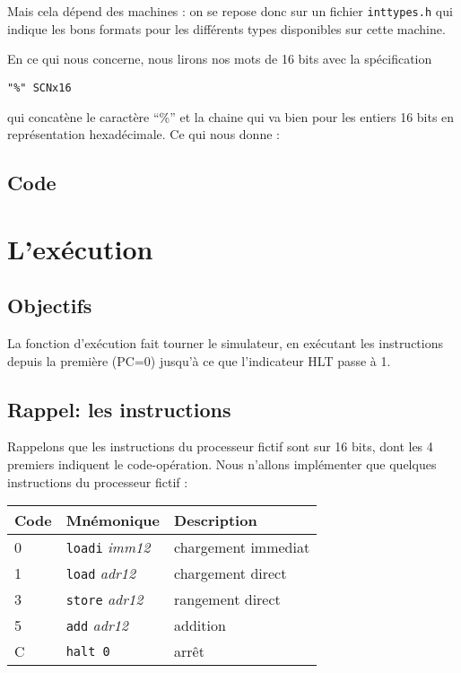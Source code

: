 \documentclass[10pt]{article}
\begin{document}
Mais cela dépend des machines : on se repose donc sur un fichier
\texttt{inttypes.h} qui indique les bons formats pour les différents types
disponibles sur cette machine.

En ce qui nous concerne, nous lirons nos mots de 16 bits avec la spécification
\begin{center}
\texttt{"\%" SCNx16}
\end{center}
qui concatène le caractère ``\%'' et la chaine qui va bien pour les 
entiers 16 bits en représentation hexadécimale. Ce qui nous donne :

\subsection{Code}
 


\section{L'exécution}

\subsection{Objectifs}
La fonction d'exécution fait tourner le simulateur, en exécutant les instructions 
depuis la première (PC=0) jusqu'à ce que l'indicateur HLT passe à 1.

\subsection{Rappel: les instructions}

Rappelons que les instructions du processeur fictif sont sur 16 bits,
dont les 4 premiers indiquent le code-opération.
Nous n'allons implémenter que quelques instructions du processeur fictif :

\begin{center}
\begin{tabular}{|lll|}
\hline
Code & Mnémonique &  Description \\
\hline
0 & \texttt{loadi} \emph{imm12} &  chargement immediat \\
1 & \texttt{load} \emph{adr12} &  chargement direct  \\
3 & \texttt{store} \emph{adr12} &  rangement direct  \\
5 & \texttt{add} \emph{adr12} & addition \\
C & \texttt{halt 0}  & arrêt \\
\hline
\end{tabular}
\end{center}
\end{document}
